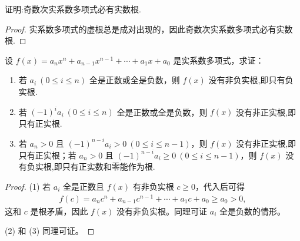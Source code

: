 \documentclass[../../main.tex]{subfiles}%
\begin{document}
\begin{example}
证明:奇数次实系数多项式必有实数根.
\end{example}
\begin{proof}
实系数多项式的虚根总是成对出现的，因此奇数次实系数多项式必有实数根.
\end{proof}

\begin{proposition}\label{proposition:实系数多项式的根的符号判定准则}
设 $f(x) = a_n x^n + a_{n-1} x^{n-1} + \cdots + a_1 x + a_0$ 是实系数多项式，求证：
\begin{enumerate}[(1)]
\item 若 $a_i \ (0 \leqslant  i \leqslant  n)$ 全是正数或全是负数，则 $f(x)$ 没有非负实根,即只有负实根.
\item 若 $(-1)^i a_i \ (0 \leqslant  i \leqslant  n)$ 全是正数或全是负数，则 $f(x)$ 没有非正实根,即只有正实根.
\item 若 $a_n > 0$ 且 $(-1)^{n-i} a_i > 0 \ (0 \leqslant  i \leqslant  n-1)$，则 $f(x)$ 没有非正实根,即只有正实根；若 $a_n > 0$ 且 $(-1)^{n-i} a_i \geqslant  0 \ (0 \leqslant  i \leqslant  n-1)$，则 $f(x)$ 没有负实根,即只有正实数和零能作为根.
\end{enumerate}
\end{proposition}
\begin{proof}
(1) 若 $a_i$ 全是正数且 $f(x)$ 有非负实根 $c \geqslant  0$，代入后可得
\begin{align*}
f(c) = a_n c^n + a_{n-1} c^{n-1} + \cdots + a_1 c + a_0 \geqslant  a_0 > 0,
\end{align*}
这和 $c$ 是根矛盾，因此 $f(x)$ 没有非负实根。同理可证 $a_i$ 全是负数的情形。

(2) 和 (3) 同理可证。
\end{proof}
\end{document}
